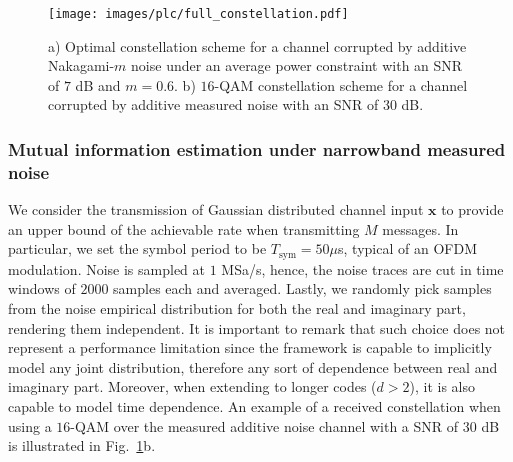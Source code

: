 \begin{figure}
	\centering
	\texttt{[image: images/plc/full\_constellation.pdf]}
	\caption{a) Optimal constellation scheme for a channel corrupted by additive Nakagami-$m$ noise under an average power constraint with an SNR of $7$ dB and $m=0.6$. b) $16$-QAM constellation scheme for a channel corrupted by additive measured noise with an SNR of $30$ dB.}
	\label{fig:plc_features}
\end{figure} 


\subsubsection{Mutual information estimation under narrowband measured noise}
\label{subsec:plc_real_constellation}
We consider the transmission of Gaussian distributed channel input $\mathbf{x}$ to provide an upper bound of the achievable rate when transmitting $M$ messages. In particular, we set the symbol period to be $T_{\text{sym}} = 50\mu$s, typical of an OFDM modulation. Noise is sampled at $1$ MSa/s, hence, the noise traces are cut in time windows of $2000$ samples each and averaged. Lastly, we randomly pick  samples from the noise empirical distribution for both the real and imaginary part, rendering them independent. It is important to remark that such choice does not represent a performance limitation since the framework is capable to implicitly model any joint distribution, therefore any sort of dependence between real and imaginary part. Moreover, when extending to longer codes ($d>2$), it is also capable to model time dependence.
An example of a received constellation when using a $16$-QAM over the measured additive noise channel with a SNR of $30$ dB is illustrated in Fig.~\ref{fig:plc_features}b.

